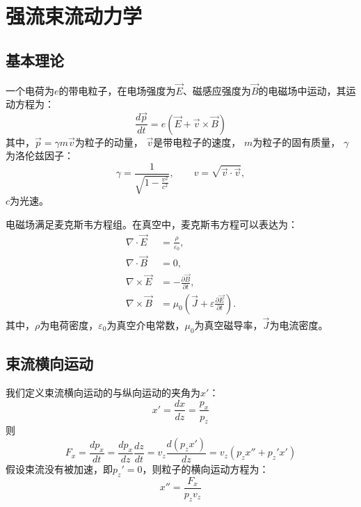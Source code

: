 
\chapter{强流束流动力学}
\label{chap:AccBasic}

\section{基本理论}
一个电荷为$e$的带电粒子，在电场强度为$\vec{E}$、磁感应强度为$\vec{B}$的电磁场中运动，其运动方程为：
\begin{equation}
    \label{eq:Newton}
    \frac{d \vec{p}}{dt}=e(\vec{E}+\vec{v} \times \vec{B})
\end{equation}
其中，$\vec{p}=\gamma m \vec{v}$为粒子的动量，
$\vec{v}$是带电粒子的速度，
$m$为粒子的固有质量，
$\gamma$为洛伦兹因子：
\begin{equation}
    \label{eq:Lorentz}
    \gamma = \frac{1}{\sqrt{1-\frac{v^2}{c^2}}}, \qquad v = \sqrt{\vec{v} \cdot \vec{v}},
\end{equation}
$c$为光速。

电磁场满足麦克斯韦方程组。在真空中，麦克斯韦方程可以表达为：
\begin{equation}
    \label{eq:Maxwell}
    \begin{aligned}
    \nabla \cdot \vec{E}  &= \frac{\rho}{{\varepsilon}_{0}}, \\
    \nabla \cdot \vec{B}  &= 0, \\
    \nabla \times \vec{E} &= -\frac{\partial \vec{B}}{\partial {t}}, \\
    \nabla \times \vec{B} &= {\mu}_{0}\left(\vec{J}+\varepsilon \frac{\partial \vec{E}}{\partial {t}}\right).
    \end{aligned}
\end{equation}
其中，$\rho$为电荷密度，$\varepsilon _0$为真空介电常数，${\mu}_{0}$为真空磁导率，$\vec{J}$为电流密度。

\section{束流横向运动}

我们定义束流横向运动的与纵向运动的夹角为$x'$：
\begin{equation}
    \label{eq:transverse1}
    x'=\frac{dx}{dz}=\frac{p_x}{p_z}
\end{equation}
则
\begin{equation}
    \label{eq:transverse2}
    F_x =\frac{dp_x}{dt}=\frac{dp_x}{dz}\frac{dz}{dt}=v_z \frac{d(p_z x')}{dz}=v_z(p_z x''+p_z'x')
\end{equation}
假设束流没有被加速，即$p_z'=0$，则粒子的横向运动方程为：
\begin{equation}
    \label{eq:transverse3}
    x'' = \frac{F_x}{p_z v_z}
\end{equation}

